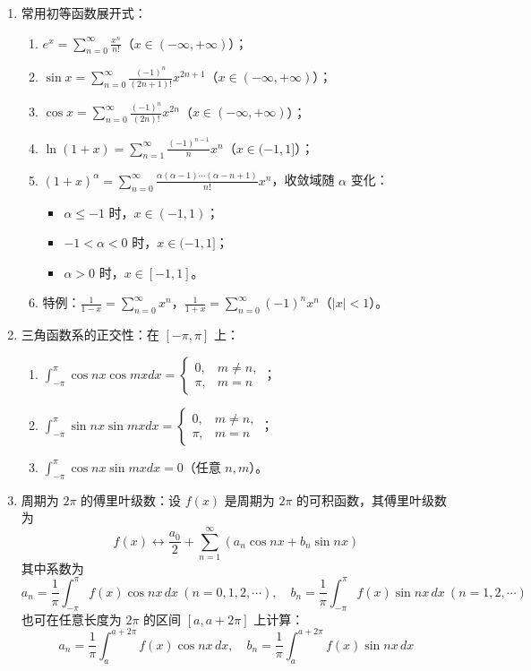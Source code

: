 \documentclass[UTF8]{ctexart}
\theoremstyle{remark}
\begin{document}
\begin{enumerate}
	\item 常用初等函数展开式：
	\begin{enumerate}
		\item \(e^x = \sum_{n=0}^{\infty}\frac{x^n}{n!}\)（\(x \in (-\infty, +\infty)\)）；
		\item \(\sin x = \sum_{n=0}^{\infty}\frac{(-1)^n}{(2n+1)!}x^{2n+1}\)（\(x \in (-\infty, +\infty)\)）；
		\item \(\cos x = \sum_{n=0}^{\infty}\frac{(-1)^n}{(2n)!}x^{2n}\)（\(x \in (-\infty, +\infty)\)）；
		\item \(\ln(1+x) = \sum_{n=1}^{\infty}\frac{(-1)^{n-1}}{n}x^n\)（\(x \in (-1, 1]\)）；
		\item \((1+x)^{\alpha} = \sum_{n=0}^{\infty}\frac{\alpha(\alpha-1)\cdots(\alpha-n+1)}{n!}x^n\)，收敛域随 \(\alpha\) 变化：
		\begin{itemize}
			\item \(\alpha \leq -1\) 时，\(x \in (-1, 1)\)；
			\item \(-1 < \alpha < 0\) 时，\(x \in (-1, 1]\)；
			\item \(\alpha > 0\) 时，\(x \in [-1, 1]\)。
		\end{itemize}
		\item 特例：\(\frac{1}{1-x} = \sum_{n=0}^{\infty}x^n\)，\(\frac{1}{1+x} = \sum_{n=0}^{\infty}(-1)^nx^n\)（\(|x| < 1\)）。
	\end{enumerate}
	
	\item 三角函数系的正交性：在 \([-\pi, \pi]\) 上：
	\begin{enumerate}
		\item \(\int_{-\pi}^{\pi}\cos nx \cos mx dx = 
		\begin{cases} 
			0, & m \neq n, \\
			\pi, & m = n 
		\end{cases}\)；
		\item \(\int_{-\pi}^{\pi}\sin nx \sin mx dx = 
		\begin{cases} 
			0, & m \neq n, \\
			\pi, & m = n 
		\end{cases}\)；
		\item \(\int_{-\pi}^{\pi}\cos nx \sin mx dx = 0\)（任意 \(n, m\)）。
	\end{enumerate}
	
	\item 周期为 \(2\pi\) 的傅里叶级数：设 \(f(x)\) 是周期为 \(2\pi\) 的可积函数，其傅里叶级数为  
	\[
	f(x) \leftrightarrow \frac{a_0}{2} + \sum_{n=1}^{\infty} (a_n \cos nx + b_n \sin nx)
	\]  
	其中系数为  
	\[
	a_n = \frac{1}{\pi} \int_{-\pi}^{\pi} f(x) \cos nx \, dx \ (n=0,1,2,\cdots), \quad b_n = \frac{1}{\pi} \int_{-\pi}^{\pi} f(x) \sin nx \, dx \ (n=1,2,\cdots)
	\]  
	也可在任意长度为 \(2\pi\) 的区间 \([a, a+2\pi]\) 上计算：  
	\[
	a_n = \frac{1}{\pi} \int_{a}^{a+2\pi} f(x) \cos nx \, dx, \quad b_n = \frac{1}{\pi} \int_{a}^{a+2\pi} f(x) \sin nx \, dx
	\]
	

\end{enumerate}
\end{document}
